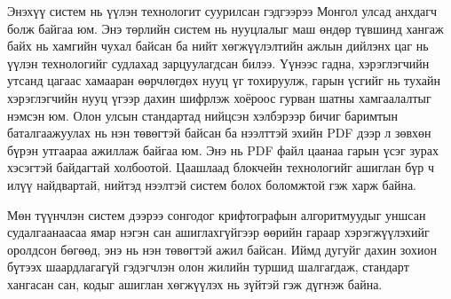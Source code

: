 \documentclass[12pt,A4]{report}
\begin{document}
Энэхүү систем нь үүлэн технологит суурилсан гэдгээрээ Монгол улсад анхдагч болж байгаа юм. Энэ төрлийн систем нь нууцлалыг маш өндөр түвшинд хангаж байх нь хамгийн чухал байсан ба нийт хөгжүүлэлтийн ажлын дийлэнх цаг нь үүлэн технологийг судлахад зарцуулагдсан билээ. Үүнээс гадна, хэрэглэгчийн утсанд цагаас хамааран өөрчлөгдөх нууц үг тохируулж, гарын үсгийг нь тухайн хэрэглэгчийн нууц үгээр дахин шифрлэж хоёроос гурван шатны хамгаалалтыг нэмсэн юм. Олон улсын стандартад нийцсэн хэлбэрээр бичиг баримтын баталгаажуулах нь нэн төвөгтэй байсан ба нээлттэй эхийн PDF дээр л зөвхөн бүрэн утгаараа ажиллаж байгаа юм. Энэ нь PDF файл цаанаа гарын үсэг зурах хэсэгтэй байдагтай холбоотой. Цаашлаад блокчейн технологийг ашиглан бүр ч илүү найдвартай, нийтэд нээлтэй систем болох боломжтой гэж харж байна.

Мөн түүнчлэн систем дээрээ сонгодог крифтографын алгоритмуудыг уншсан судалгаанаасаа ямар нэгэн сан ашиглахгүйгээр өөрийн гараар хэрэгжүүлэхийг оролдсон бөгөөд, энэ нь нэн төвөгтэй ажил байсан. Иймд дугуйг дахин зохион бүтээх шаардлагагүй гэдэгчлэн олон жилийн туршид шалгагдаж, стандарт хангасан сан, кодыг ашиглан хөгжүүлэх нь зүйтэй гэж дүгнэж байна.





\end{document}
